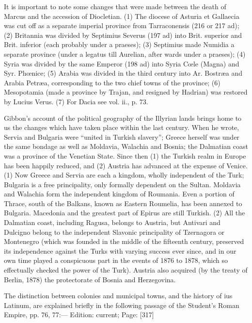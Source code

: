 It is important to note some changes that were made between the death of Marcus and the accession of Diocletian. (1) The diocese of Asturia et Gallaecia was cut off as a separate imperial province from Tarraconensis (216 or 217 ad); (2) Britannia was divided by Septimius Severus (197 ad) into Brit. superior and Brit. inferior (each probably under a praeses); (3) Septimius made Numidia a separate province (under a legatus till Aurelian, after wards under a praeses); (4) Syria was divided by the same Emperor (198 ad) into Syria Cœle (Magna) and Syr. Phœnice; (5) Arabia was divided in the third century into Ar. Bostræa and Arabia Petræa, corresponding to the two chief towns of the province; (6) Mesopotamia (made a province by Trajan, and resigned by Hadrian) was restored by Lucius Verus. (7) For Dacia see vol. ii., p. 73.


Gibbon\texthebrew{}’s account of the political geography of the Illyrian lands brings home to us the changes which have taken place within the last century. When he wrote, Servia and Bulgaria were \texthebrew{“}united in Turkish slavery\texthebrew{}”; Greece herself was under the same bondage as well as Moldavia, Walachia and Bosnia; the Dalmatian coast was a province of the Venetian State. Since then (1) the Turkish realm in Europe has been happily reduced, and (2) Austria has advanced at the expense of Venice. (1) Now Greece and Servia are each a kingdom, wholly independent of the Turk; Bulgaria is a free principality, only formally dependent on the Sultan. Moldavia and Walachia form the independent kingdom of Roumania. Even a portion of Thrace, south of the Balkans, known as Eastern Roumelia, has been annexed to Bulgaria. Macedonia and the greatest part of Epirus are still Turkish. (2) All the Dalmatian coast, including Ragusa, belongs to Austria, but Antivari and Dulcigno belong to the independent Slavonic principality of Tzernagora or Montenegro (which was founded in the middle of the fifteenth century, preserved its independence against the Turks with varying success ever since, and in our own time played a conspicuous part in the events of 1876 to 1878, which so effectually checked the power of the Turk). Austria also acquired (by the treaty of Berlin, 1878) the protectorate of Bosnia and Herzegovina.


The distinction between colonies and municipal towns, and the history of ius Latinum, are explained briefly in the following passage of the Student\texthebrew{}’s Roman Empire, pp. 76, 77:\texthebrew{—
}Edition: current; Page: [317]

